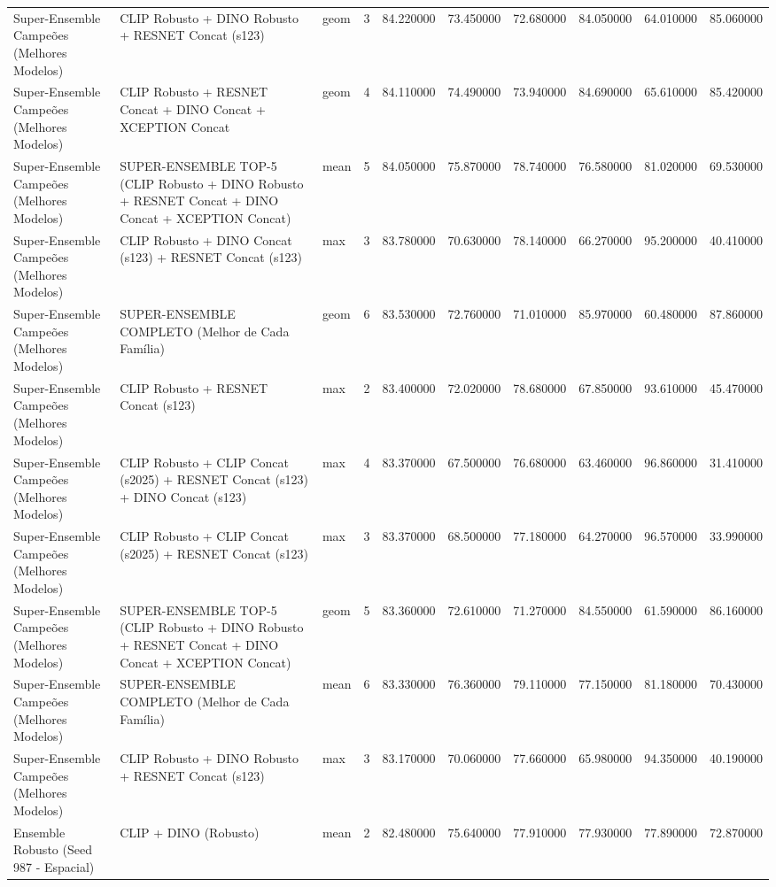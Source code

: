 \begin{table}
\begin{tabular}{lllrrrrrrr}
Super-Ensemble Campeões (Melhores Modelos) & CLIP Robusto + DINO Robusto + RESNET Concat (s123) & geom & 3 & 84.220000 & 73.450000 & 72.680000 & 84.050000 & 64.010000 & 85.060000 \\
Super-Ensemble Campeões (Melhores Modelos) & CLIP Robusto + RESNET Concat + DINO Concat + XCEPTION Concat & geom & 4 & 84.110000 & 74.490000 & 73.940000 & 84.690000 & 65.610000 & 85.420000 \\
Super-Ensemble Campeões (Melhores Modelos) & SUPER-ENSEMBLE TOP-5 (CLIP Robusto + DINO Robusto + RESNET Concat + DINO Concat + XCEPTION Concat) & mean & 5 & 84.050000 & 75.870000 & 78.740000 & 76.580000 & 81.020000 & 69.530000 \\
Super-Ensemble Campeões (Melhores Modelos) & CLIP Robusto + DINO Concat (s123) + RESNET Concat (s123) & max & 3 & 83.780000 & 70.630000 & 78.140000 & 66.270000 & 95.200000 & 40.410000 \\
Super-Ensemble Campeões (Melhores Modelos) & SUPER-ENSEMBLE COMPLETO (Melhor de Cada Família) & geom & 6 & 83.530000 & 72.760000 & 71.010000 & 85.970000 & 60.480000 & 87.860000 \\
Super-Ensemble Campeões (Melhores Modelos) & CLIP Robusto + RESNET Concat (s123) & max & 2 & 83.400000 & 72.020000 & 78.680000 & 67.850000 & 93.610000 & 45.470000 \\
Super-Ensemble Campeões (Melhores Modelos) & CLIP Robusto + CLIP Concat (s2025) + RESNET Concat (s123) + DINO Concat (s123) & max & 4 & 83.370000 & 67.500000 & 76.680000 & 63.460000 & 96.860000 & 31.410000 \\
Super-Ensemble Campeões (Melhores Modelos) & CLIP Robusto + CLIP Concat (s2025) + RESNET Concat (s123) & max & 3 & 83.370000 & 68.500000 & 77.180000 & 64.270000 & 96.570000 & 33.990000 \\
Super-Ensemble Campeões (Melhores Modelos) & SUPER-ENSEMBLE TOP-5 (CLIP Robusto + DINO Robusto + RESNET Concat + DINO Concat + XCEPTION Concat) & geom & 5 & 83.360000 & 72.610000 & 71.270000 & 84.550000 & 61.590000 & 86.160000 \\
Super-Ensemble Campeões (Melhores Modelos) & SUPER-ENSEMBLE COMPLETO (Melhor de Cada Família) & mean & 6 & 83.330000 & 76.360000 & 79.110000 & 77.150000 & 81.180000 & 70.430000 \\
Super-Ensemble Campeões (Melhores Modelos) & CLIP Robusto + DINO Robusto + RESNET Concat (s123) & max & 3 & 83.170000 & 70.060000 & 77.660000 & 65.980000 & 94.350000 & 40.190000 \\
Ensemble Robusto (Seed 987 - Espacial) & CLIP + DINO (Robusto) & mean & 2 & 82.480000 & 75.640000 & 77.910000 & 77.930000 & 77.890000 & 72.870000 \\

\end{tabular}
\end{table}
